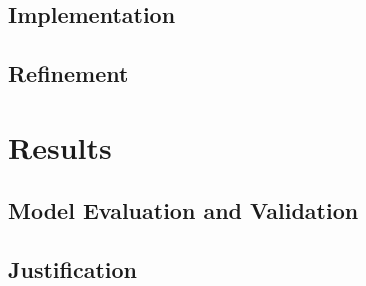 \documentclass[paper=A4, DIV=calc, parskip=half]{scrartcl}
\begin{document}
\subsection*{Implementation}


\subsection*{Refinement}


\section*{Results}

\subsection*{Model Evaluation and Validation}


\subsection*{Justification}

\end{document}
